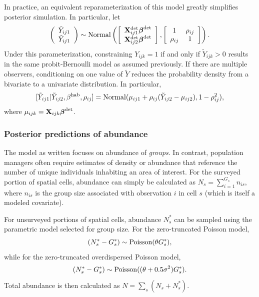 \documentclass[10pt]{article}
\begin{document}
In practice, an equivalent reparameterization of this model greatly simplifies posterior simulation. In particular, let
\begin{equation} \label{eq:obs.mod}
\left(\begin{array}{c}
				\tilde{Y}_{ij1} \\
				\tilde{Y}_{ij1}
		\end{array}\right) \sim {\rm Normal}
\left( \left[ \begin{array}{c}
				{\bf X}_{ij1}^{\rm det} \boldsymbol{\beta}^{\rm det}\\
				{\bf X}_{ij2}^{\rm det} \boldsymbol{\beta}^{\rm det}
		\end{array}\right],
        \left[ \begin{array}{cc}
            1 & \rho_{ij} \\
            \rho_{ij} & 1
        \end{array} \right]
\right).
\end{equation}
Under this parameterization, constraining $Y_{ijk}=1$ if and only if $\tilde{Y}_{ijk}>0$ results in the same probit-Bernoulli model as assumed previously.
If there are multiple observers, conditioning on one value of $\tilde{Y}$ reduces the probability density from a bivariate to a univariate distribution.  In particular,
\begin{equation}
\label{eq:biv_to_univ}
[\tilde{Y}_{ij1} | \tilde{Y}_{ij2},\beta^{\rm hab},\rho_{ij}]={\rm Normal}(\mu_{ij1}+\rho_{ij}(\tilde{Y}_{ij2}-\mu_{ij2}),1-\rho_{ij}^2),
\end{equation}
where $\mu_{ijk}={\bf X}_{ijk} \boldsymbol{\beta}^{\rm det}$.


\subsubsection*{Posterior predictions of abundance}

The model as written focuses on abundance of \emph{groups}.  In contrast, population managers often require estimates of density or abundance that reference the number of unique individuals inhabiting an area of interest.  For the surveyed portion of spatial cells, abundance can simply be calculated as $N_s=\sum_{i=1}^{G_s} n_{is}$, where $n_{is}$ is the group size associated with observation $i$ in cell $s$ (which is itself a modeled covariate).

For unsurveyed portions of spatial cells, abundance $N_s^*$ can be sampled using the parametric model selected for group size.  For the zero-truncated Poisson model,
$$(N_s^*-G_s^*) \sim {\rm Poisson}(\theta G_s^*),
$$
while for the zero-truncated overdispersed Poisson model,
$$(N_s^*-G_s^*) \sim {\rm Poisson}((\theta+0.5\sigma^2) G_s^*).$$
Total abundance is then calculated as $N=\sum_s (N_s+N_s^*)$.
\end{document}

